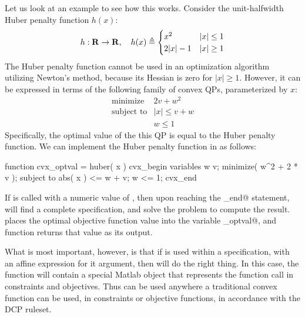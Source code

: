 \documentclass[12pt]{article}
\begin{document}
Let us look at an example to see how this works.
Consider the unit-halfwidth Huber penalty function $h(x)$:
\begin{equation}
	h:\R\rightarrow\R, \quad h(x) \eqbydef \Cases{ x^2 & |x| \leq 1 \\ 2|x|-1 & |x| \geq 1 }
\end{equation}
The Huber penalty function cannot be used in an optimization algorithm
utilizing Newton's method,
because its Hessian is zero for $|x|\geq 1$. However,
it can be expressed in terms of the following family of convex QPs,
parameterized by $x$:
\begin{equation}
	\begin{array}{ll}
		\text{minimize}   & 2 v + w^2 \\
		\text{subject to} & | x | \leq v + w \\
		                  & w \leq 1
	\end{array}
\end{equation}
Specifically, the optimal value of the this QP is equal to the Huber
penalty function.
We can implement the Huber penalty function in \cvx as follows:
\begin{code}
	function cvx_optval = huber( x )
	cvx_begin
	    variables w v;
	    minimize( w^2 + 2 * v );
	    subject to
	        abs( x ) <= w + v;
	        w <= 1;
	cvx_end
\end{code}
If \verb@huber@ is called with a numeric value of \verb@x@, then
upon reaching the \verb@cvx_end@ statement, \cvx will find a complete
specification, and solve the problem to compute the result.
\cvx places the optimal objective function value
into the variable \verb@cvx_optval@, and
function returns that value as its output.

What is most important, however, is that if \verb@huber@
is used within a \cvx specification, with an affine \cvx expression
for it argument, then \cvx will do the right thing.
In this case, the function \verb@huber@ will contain a special Matlab object that
represents the function call in constraints and objectives.
Thus \verb@huber@ can be used anywhere a traditional convex
function can be used, in constraints or objective functions,
in accordance with the DCP ruleset.
\end{document}
